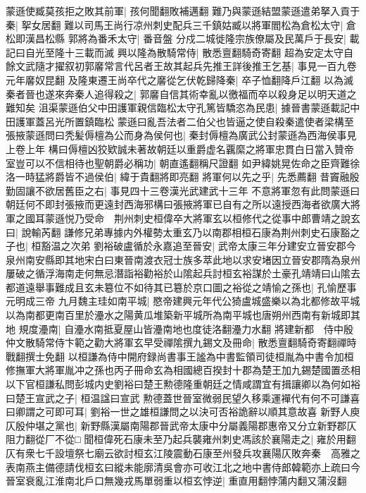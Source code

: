 蒙遜使臧莫孩拒之敗其前軍|{
	孩何聞翻敗補邁翻}
難乃與蒙遜結盟蒙遜遣弟拏入貢于秦|{
	挐女居翻}
難以司馬王尚行凉州刺史配兵三千鎮姑臧以將軍閻松為倉松太守|{
	倉松即漢昌松縣}
郭將為番禾太守|{
	番音盤}
分戍二城徙隆宗族僚屬及民萬戶于長安|{
	載記曰自光至隆十三載而滅}
興以隆為散騎常侍|{
	散悉亶翻騎奇寄翻}
超為安定太守自餘文武隨才擢叙初郭黁常言代呂者王故其起兵先推王詳後推王乞基|{
	事見一百九卷元年黁奴昆翻}
及隆東遷王尚卒代之黁從乞伏乾歸降秦|{
	卒子恤翻降戶江翻}
以為滅秦者晉也遂來奔秦人追得殺之|{
	郭黁自信其術幸亂以徼福而卒以殺身足以明天道之難知矣}
沮渠蒙遜伯父中田護軍親信臨松太守孔篤皆驕恣為民患|{
	據晉書蒙遜載記中田護軍蓋呂光所置鎮臨松}
蒙遜曰亂吾法者二伯父也皆逼之使自殺秦遣使者梁構至張掖蒙遜問曰秃髪傉檀為公而身為侯何也|{
	秦封傉檀為廣武公封蒙遜為西海侯事見上卷上年}
構曰傉檀凶狡欵誠未著故朝廷以重爵虚名覊縻之將軍忠貫白日當入贊帝室豈可以不信相待也聖朝爵必稱功|{
	朝直遙翻稱尺證翻}
如尹緯姚晃佐命之臣齊難徐洛一時猛將爵皆不過侯伯|{
	緯于貴翻將即亮翻}
將軍何以先之乎|{
	先悉薦翻}
昔竇融殷勤固讓不欲居舊臣之右|{
	事見四十三卷漢光武建武十三年}
不意將軍忽有此問蒙遜曰朝廷何不即封張掖而更遠封西海邪構曰張掖將軍已自有之所以遠授西海者欲廣大將軍之國耳蒙遜悦乃受命　荆州刺史桓偉卒大將軍玄以桓修代之從事中郎曹靖之說玄曰|{
	說輸芮翻}
謙修兄弟專據内外權勢太重玄乃以南郡相桓石康為荆州刺史石康豁之子也|{
	桓豁温之次弟}
劉裕破盧循於永嘉追至晉安|{
	武帝太康三年分建安立晉安郡今泉州南安縣即其地宋白曰東晉南渡衣冠士族多萃此地以求安堵因立晉安郡隋為泉州}
屢破之循浮海南走何無忌潛詣裕勸裕於山隂起兵討桓玄裕謀於土豪孔靖靖曰山隂去都道遠舉事難成且玄未簒位不如待其已簒於京口圖之裕從之靖愉之孫也|{
	孔愉歷事元明成三帝}
九月魏主珪如南平城|{
	愍帝建興元年代公猗盧城盛樂以為北都修故平城以為南都更南百里於灅水之陽黄瓜堆築新平城所為南平城也唐朔州西南有新城即其地}
規度灅南|{
	自灅水南抵夏屋山皆灅南地也度徒洛翻灅力水翻}
將建新都　侍中殷仲文散騎常侍卞範之勸大將軍玄早受禪隂撰九錫文及冊命|{
	散悉亶翻騎奇寄翻禪時戰翻撰士免翻}
以桓謙為侍中開府録尚書事王謐為中書監領司徒桓胤為中書令加桓修撫軍大將軍胤冲之孫也丙子冊命玄為相國總百揆封十郡為楚王加九錫楚國置丞相以下官桓謙私問彭城内史劉裕曰楚王勲德隆重朝廷之情咸謂宜有揖讓卿以為何如裕曰楚王宣武之子|{
	桓温諡曰宣武}
勲德蓋世晉室微弱民望久移乘運襌代有何不可謙喜曰卿謂之可即可耳|{
	劉裕一世之雄桓謙問之以決可否裕詭辭以順其意故喜}
新野人庾仄殷仲堪之黨也|{
	新野縣漢屬南陽郡晉武帝太康中分屬義陽郡惠帝又分立新野郡仄阻力翻從厂不從□}
聞桓偉死石康未至乃起兵襲雍州刺史馮該於襄陽走之|{
	雍於用翻}
仄有衆七千設壇祭七廟云欲討桓玄江陵震動石康至州發兵攻襄陽仄敗奔秦　高雅之表南燕主備德請伐桓玄曰縱未能廓清吳會亦可收江北之地中書侍郎韓範亦上疏曰今晉室衰亂江淮南北戶口無幾戎馬單弱重以桓玄悖逆|{
	重直用翻悖蒲内翻又蒲沒翻}
